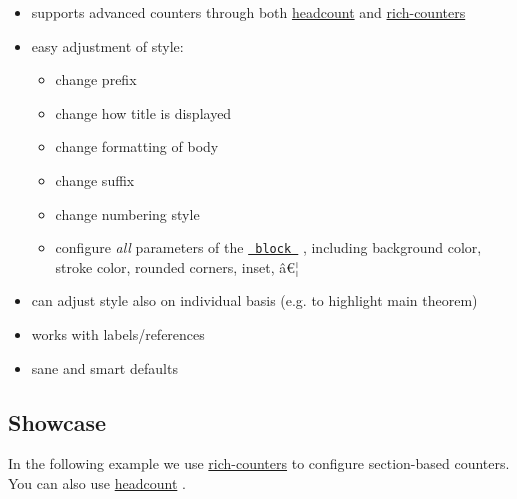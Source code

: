 \begin{itemize}
\tightlist
\item
  supports advanced counters through both
  \href{https://typst.app/universe/package/headcount/}{headcount} and
  \href{https://typst.app/universe/package/rich-counters/}{rich-counters}
\item
  easy adjustment of style:

  \begin{itemize}
  \tightlist
  \item
    change prefix
  \item
    change how title is displayed
  \item
    change formatting of body
  \item
    change suffix
  \item
    change numbering style
  \item
    configure \emph{all} parameters of the
    \href{https://typst.app/docs/reference/layout/block/}{\texttt{\ block\ }}
    , including background color, stroke color, rounded corners, inset,
    â€¦
  \end{itemize}
\item
  can adjust style also on individual basis (e.g. to highlight main
  theorem)
\item
  works with labels/references
\item
  sane and smart defaults
\end{itemize}

\subsection{Showcase}\label{showcase}

In the following example we use
\href{https://typst.app/universe/package/rich-counters/}{rich-counters}
to configure section-based counters. You can also use
\href{https://typst.app/universe/package/headcount/}{headcount} .

